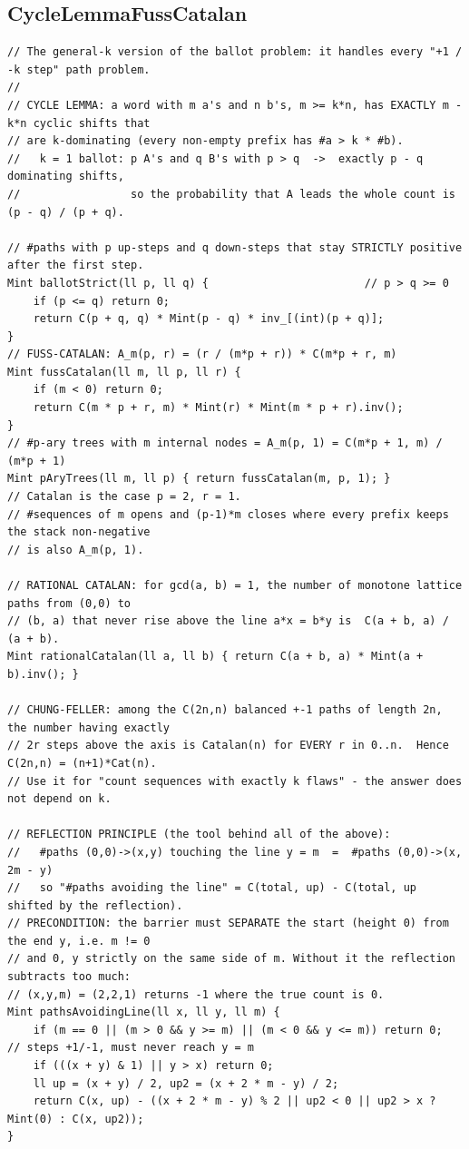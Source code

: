 \documentclass[9pt,a4paper,twocolumn]{extarticle}
\begin{document}
\filbreak
\subsection{CycleLemmaFussCatalan}
\nopagebreak
\begin{lstlisting}
// The general-k version of the ballot problem: it handles every "+1 / -k step" path problem.
//
// CYCLE LEMMA: a word with m a's and n b's, m >= k*n, has EXACTLY m - k*n cyclic shifts that
// are k-dominating (every non-empty prefix has #a > k * #b).
//   k = 1 ballot: p A's and q B's with p > q  ->  exactly p - q dominating shifts,
//                 so the probability that A leads the whole count is (p - q) / (p + q).

// #paths with p up-steps and q down-steps that stay STRICTLY positive after the first step.
Mint ballotStrict(ll p, ll q) {                        // p > q >= 0
    if (p <= q) return 0;
    return C(p + q, q) * Mint(p - q) * inv_[(int)(p + q)];
}
// FUSS-CATALAN: A_m(p, r) = (r / (m*p + r)) * C(m*p + r, m)
Mint fussCatalan(ll m, ll p, ll r) {
    if (m < 0) return 0;
    return C(m * p + r, m) * Mint(r) * Mint(m * p + r).inv();
}
// #p-ary trees with m internal nodes = A_m(p, 1) = C(m*p + 1, m) / (m*p + 1)
Mint pAryTrees(ll m, ll p) { return fussCatalan(m, p, 1); }
// Catalan is the case p = 2, r = 1.
// #sequences of m opens and (p-1)*m closes where every prefix keeps the stack non-negative
// is also A_m(p, 1).

// RATIONAL CATALAN: for gcd(a, b) = 1, the number of monotone lattice paths from (0,0) to
// (b, a) that never rise above the line a*x = b*y is  C(a + b, a) / (a + b).
Mint rationalCatalan(ll a, ll b) { return C(a + b, a) * Mint(a + b).inv(); }

// CHUNG-FELLER: among the C(2n,n) balanced +-1 paths of length 2n, the number having exactly
// 2r steps above the axis is Catalan(n) for EVERY r in 0..n.  Hence C(2n,n) = (n+1)*Cat(n).
// Use it for "count sequences with exactly k flaws" - the answer does not depend on k.

// REFLECTION PRINCIPLE (the tool behind all of the above):
//   #paths (0,0)->(x,y) touching the line y = m  =  #paths (0,0)->(x, 2m - y)
//   so "#paths avoiding the line" = C(total, up) - C(total, up shifted by the reflection).
// PRECONDITION: the barrier must SEPARATE the start (height 0) from the end y, i.e. m != 0
// and 0, y strictly on the same side of m. Without it the reflection subtracts too much:
// (x,y,m) = (2,2,1) returns -1 where the true count is 0.
Mint pathsAvoidingLine(ll x, ll y, ll m) {
    if (m == 0 || (m > 0 && y >= m) || (m < 0 && y <= m)) return 0;             // steps +1/-1, must never reach y = m
    if (((x + y) & 1) || y > x) return 0;
    ll up = (x + y) / 2, up2 = (x + 2 * m - y) / 2;
    return C(x, up) - ((x + 2 * m - y) % 2 || up2 < 0 || up2 > x ? Mint(0) : C(x, up2));
}
\end{lstlisting}
\end{document}
